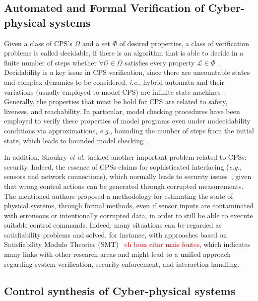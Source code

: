 \documentclass[format=acmsmall, review=false, screen=true]{acmart}
\begin{document}
\subsection{Automated and Formal Verification of Cyber-physical systems}
\label{ssec:verification}

Given a class of CPS's $\Omega$ and a set $\Phi$ of desired properties, a class of verification problems is called decidable, if there is an algorithm that is able to decide in a finite number of steps whether $\forall \mathcal{O}\in\Omega$ satisfies every property $\mathcal{L}\in \Phi$~\cite{Alur00}. Decidability is a key issue in CPS verification, since there are uncountable states and complex dynamics to be considered, {\it i.e.}, hybrid automata and their variations (usually employed to model CPS) are infinite-state machines~\cite{Henzinger95}. Generally, the properties that must be hold for CPS are related to safety, liveness, and reachability. In particular, model checking procedures have been employed to verify these properties of model programs even under undecidability conditions via approximations, {\it e.g.}, bounding the number of steps from the initial state, which leads to bounded model checking~\cite{Veanes09}.

In addition, Shoukry {\it et al.} \cite{Shoukry} tackled another important problem related to CPSs: security. Indeed, the essence of CPSs claims for sophisticated interfacing ({\it e.g.}, sensors and network connections), which normally leads to security issues~\cite{cpsattack}, given that wrong control actions can be generated through corrupted measurements. The mentioned authors proposed a methodology for estimating the state of physical systems, through formal methods, even if sensor inputs are contaminated with erroneous or intentionally corrupted data, in order to still be able to execute suitable control commands. Indeed, many situations can be regarded as satisfiability problems and solved, for instance, with approaches based on Satisfiability Modulo Theories (SMT)~\cite{Araujo16} \textcolor{red}{eh bom citar mais fontes}, which indicates many links with other research areas and might lead to a unified approach regarding system verification, security enforcement, and interaction handling.

\subsection{Control synthesis of Cyber-physical systems}
\label{ssec:synthesis}
\end{document}
